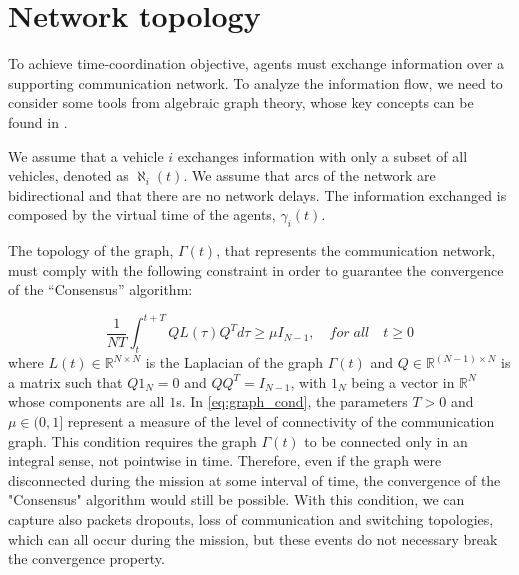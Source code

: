 \section{Network topology\label{sec:network_topology}}

To achieve time-coordination objective, agents must exchange information
over a supporting communication network.
To analyze the information flow, we need to consider some tools from algebraic graph
theory, whose key concepts can be found in \cite{graphBook}.

We assume that a vehicle $i$ exchanges information with only a subset of all
vehicles, denoted as $\aleph_i(t)$.
We assume that arcs of the network are bidirectional and that there are no
network delays.
The information exchanged is composed by the virtual time of the agents,
$\gamma_i(t)$.

The topology of the graph, $\Gamma(t)$, that represents the communication network,
must comply with the following constraint in order to guarantee the convergence
of the “Consensus” algorithm:

\begin{equation}  \label{eq:graph_cond}
  \frac{1}{NT} \int_t^{t+T} Q L (\tau) Q^T d \tau \ge \mu I_{N-1}, \quad for \; all \quad t \ge 0
\end{equation}
where $L(t) \in \mathbb{R}^{N \times N}$ is the Laplacian of the graph $\Gamma(t)$
and $Q \in \mathbb{R}^{(N-1) \times N}$ is a matrix such that $Q 1_N = 0$ and
$QQ^T = I_{N-1}$, with $1_N$ being a vector in $\mathbb{R}^N$ whose components
are all $1$s.
In \eqref{eq:graph_cond}, the parameters $T > 0$ and $\mu \in (0,1]$ represent
a measure of the level of connectivity of the communication graph.
This condition requires the graph $\Gamma(t)$ to be connected only in an integral
sense, not pointwise in time. Therefore, even if the graph were disconnected during
the mission at some interval of time, the convergence of the "Consensus" algorithm
would still be possible.
With this condition, we can capture also packets dropouts, loss of communication and
switching topologies, which can all occur during the mission, but these events do not necessary
break the convergence property.
